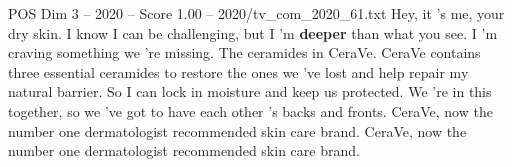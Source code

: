 \begin{textsample}{POS Dim 3 – 2020 – Score 1.00 – 2020/tv\_com\_2020\_61.txt}  \label{ex:f3_pos_069}
Hey, it 's me, your dry skin.
I know I can be challenging, but I 'm \textbf{deeper} than what you see.
I 'm craving something we 're missing.
The ceramides in CeraVe.
CeraVe contains three essential ceramides to restore the ones we 've lost and help repair my natural barrier.
So I can lock in moisture and keep us protected.
We 're in this together, so we 've got to have each other 's backs and fronts.
CeraVe, now the number one dermatologist recommended skin care brand.
CeraVe, now the number one dermatologist recommended skin care brand.

\end{textsample}
